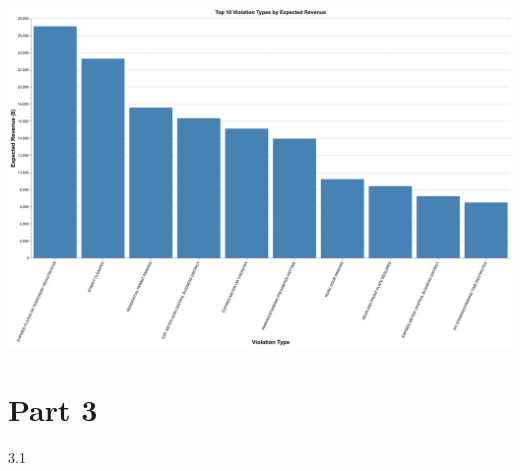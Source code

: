 \documentclass[
  letterpaper,
  DIV=11,
  numbers=noendperiod]{scrartcl}
\begin{document}
\includegraphics{ps2_final_files/figure-pdf/cell-19-output-1.png}

\section{Part 3}\label{part-3}

3.1
\end{document}
